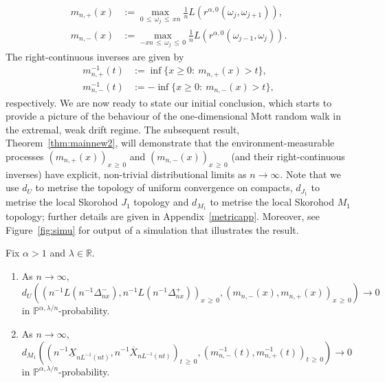 \documentclass[AHL,Unicode,longabstracts,published]{cedram}
\newcommand{\R}{\mathbb R}
\renewcommand{\P}{\mathbb P}
\newcommand*{\alphenumi}{\renewcommand*{\theenumi}{\alph{enumi}}}
\begin{document}
\begin{align}
m_{n,+}(x)&:=\max_{0\,\le\,\omega_j\,\le\,xn} \frac{1}{n}L\left(r^{\alpha,0}\left(\omega_j,\omega_{j+1}\right)\right),\label{mnp}
\\
m_{n,-}(x)&:=\max_{-xn\,\leq\,\omega_j\,\le\,0} \frac{1}{n}L\left(r^{\alpha,0}\left(\omega_{j-1},\omega_{j}\right)\right).\label{mnn}
\end{align}
The right-continuous inverses are given by
\begin{align}
m^{-1}_{n,+}(t)&:=\inf\{x\geq 0:\:m_{n,+}(x)>t\},\label{mnpinv}
\\
m^{-1}_{n,-}(t)&:=-\inf\{x\geq 0:\:m_{n,-}(x)>t\},\label{mnninv}
\end{align}
respectively. We are now ready to state our initial conclusion, which starts to provide a picture of the behaviour of the one-dimensional Mott random walk in the extremal, weak drift regime. The subsequent result, Theorem~\ref{thm:mainnew2}, will demonstrate that the environment-measurable processes $(m_{n,+}(x))_{x\,\geq\,0}$ and $(m_{n,-}(x))_{x\,\geq\,0}$ (and their right-continuous inverses) have explicit, non-trivial distributional limits as $n\rightarrow\infty$. Note that we use $d_U$ to metrise the topology of uniform convergence on compacts, $d_{J_1}$ to metrise the local Skorohod $J_1$ topology and $d_{M_1}$ to metrise the local Skorohod $M_1$ topology; further details are given in Appendix~\ref{metricapp}. Moreover, see Figure~\ref{fig:simu} for output of a simulation that illustrates the result.

\begin{theo}\label{thm:mainnew1}
Fix $\alpha>1$ and $\lambda\in\R$.
\begin{enumerate}\alphenumi
\item\label{theo1.1.a} As $n\rightarrow\infty$,
\[
d_{U}\left(\left(n^{-1}L\left(n^{-1}\Delta^-_{nx}\right),n^{-1}L\left(n^{-1}\Delta^+_{nx}\right)\right)_{x\,\geq\,0},\left(m_{n,-}(x),m_{n,+}(x)\right)_{x\,\geq\,0}\right)\rightarrow 0
\]
in $\P^{\alpha,\lambda/n}$-probability.
\item\label{theo1.1.b} As $n\rightarrow\infty$,
\[
d_{M_1}\left(\left(n^{-1}\underline{X}_{nL^{-1}(n t)},n^{-1}\overline{X}_{nL^{-1}(n t)}\right)_{t\,\geq\,0},\left(m_{n,-}^{-1}(t),m_{n,+}^{-1}(t)\right)_{t\,\geq\,0}\right)\rightarrow 0
\]
in $\P^{\alpha,\lambda/n}$-probability.
\end{enumerate}
\end{theo}
\end{document}
